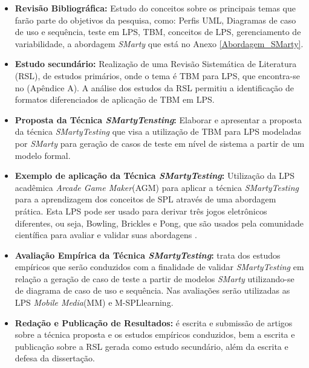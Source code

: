 \begin{itemize}
	\item \textbf{Revisão Bibliográfica:} Estudo do conceitos sobre os principais temas que farão parte do objetivos da pesquisa, como: Perfis UML, Diagramas de caso de uso e sequência, teste em LPS, TBM, conceitos de LPS, gerenciamento de variabilidade, a abordagem \textit{SMarty} que está no Anexo \ref{Abordagem_SMarty}. 
	
	\item \textbf{Estudo secundário:} Realização de uma Revisão Sistemática de Literatura (RSL), de estudos primários, onde o tema é TBM para LPS, que encontra-se no (Apêndice A). A análise dos estudos da RSL permitiu a identificação de formatos diferenciados de aplicação de TBM em LPS.
	
	\item \textbf{Proposta da Técnica \textit{SMartyTensting}:} Elaborar e apresentar a proposta da técnica \textit{SMartyTesting} que visa a utilização de TBM para LPS modeladas por \textit{SMarty} para geração de casos de teste em nível de sistema a partir de um modelo formal.
	
	\item \textbf{Exemplo de aplicação da Técnica \textit{SMartyTesting}:} Utilização da LPS acadêmica \textit{Arcade Game Maker}(AGM) para aplicar a técnica \textit{SMartyTesting} para a aprendizagem dos conceitos de SPL através de uma abordagem prática. Esta LPS pode ser usado para derivar três jogos eletrônicos diferentes, ou seja, Bowling, Brickles e Pong, que são usados pela comunidade científica para avaliar e validar suas abordagens \cite{costa2016split}.
		
	\item \textbf{Avaliação Empírica da Técnica \textit{SMartyTesting}:} trata dos estudos empíricos que serão conduzidos com a finalidade de validar \textit{SMartyTesting} em relação a geração de caso de teste a partir de modelos \textit{SMarty} utilizando-se de diagrama de caso de uso e sequência. Nas avaliações serão utilizadas as LPS \textit{Mobile Media}(MM) e M-SPLlearning.
	
	\item \textbf{Redação e Publicação de Resultados:} é escrita e submissão de artigos sobre a técnica proposta e os estudos empíricos conduzidos, bem a escrita e publicação sobre a RSL gerada como estudo secundário, além da escrita e defesa da dissertação.
	
	
\end{itemize}


